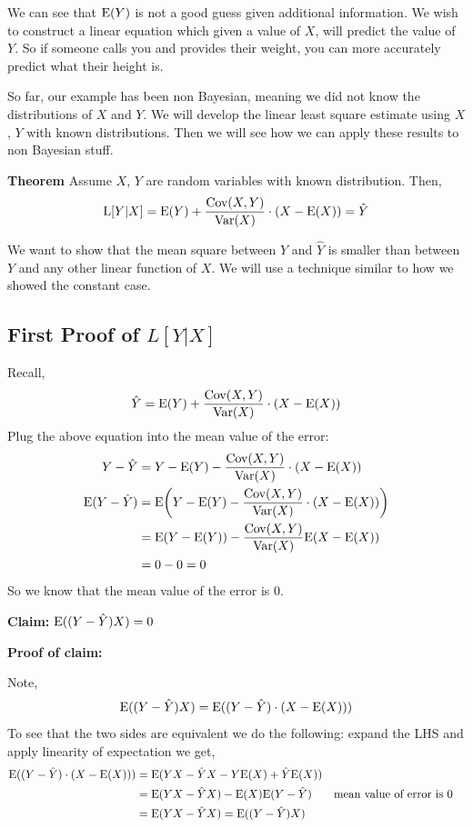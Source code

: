 \documentclass{exam}
\begin{document}
We can see that $\text{E}(Y)$ is not a good guess given additional information. We wish to construct a linear equation which given a value of $X$, will predict the value of $Y$. So if someone calls you and provides their weight, you can more accurately predict what their height is.

So far, our example has been non Bayesian, meaning we did not know the distributions of $X$ and $Y$. We will develop the linear least square estimate using $X$, $Y$ with known distributions. Then we will see how we can apply these results to non Bayesian stuff.

\textbf{Theorem}
Assume $X$, $Y$ are random variables with known distribution. Then, 
\[\text{L}[Y | X] = \text{E}(Y) + \frac{\text{Cov}(X, Y)}{\text{Var}(X)} \cdot (X - \text{E}(X)) = \hat{Y}\]

We want to show that the mean square between $Y$ and $\hat{Y}$ is smaller than between $Y$ and any other linear function of $X$. We will use a technique similar to how we showed the constant case.

\clearpage

\subsection{First Proof of $L[Y | X]$}
Recall,
\[\hat{Y} = \text{E}(Y) + \frac{\text{Cov}(X, Y)}{\text{Var}(X)} \cdot (X - \text{E}(X))  \]
Plug the above equation into the mean value of the error:
\begin{align*}
Y - \hat{Y} &= Y - \text{E}(Y) - \frac{\text{Cov}(X, Y)}{\text{Var}(X)} \cdot (X - \text{E}(X))\\
\text{E}(Y - \hat{Y}) &= \text{E}\bigg(Y - \text{E}(Y) - \frac{\text{Cov}(X, Y)}{\text{Var}(X)} \cdot (X - \text{E}(X))\bigg)\\
&= \text{E}(Y - \text{E}(Y)) - \frac{\text{Cov}(X, Y)}{\text{Var}(X)} \text{E}(X - \text{E}(X))\\
&= 0 - 0 = 0
\end{align*}
So we know that the mean value of the error is 0.

\textbf{Claim: } $\text{E}((Y - \hat{Y})X) = 0$

\textbf{Proof of claim:}

Note,
\[\text{E}((Y - \hat{Y})X) = \text{E}((Y - \hat{Y}) \cdot (X - \text{E}(X)))\]
To see that the two sides are equivalent we do the following:  expand the LHS and apply linearity of expectation we get,
\begin{align*}
\text{E}((Y - \hat{Y}) \cdot (X - \text{E}(X))) &= \text{E}(YX - \hat{Y}X - Y \text{E}(X) + \hat{Y} \text{E}(X))\\
&= \text{E}(YX - \hat{Y}X) - \text{E}(X) \text{E}(Y - \hat{Y}) && \text{mean value of error is 0}\\
&= \text{E}(YX - \hat{Y}X) = \text{E}((Y - \hat{Y})X)
\end{align*}
\end{document}
